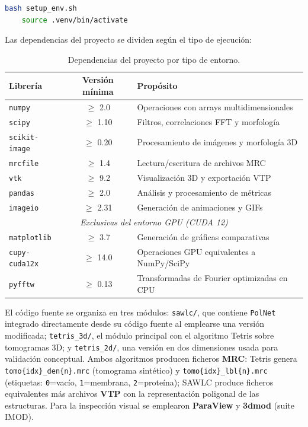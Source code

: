 \begin{enumerate}
    \begin{lstlisting}[language=bash]
    bash setup_env.sh
    source .venv/bin/activate
    \end{lstlisting}

    Las dependencias del proyecto se dividen según el tipo de ejecución:
    
    \begin{table}[H]
        \centering
        \begin{tabular}{|l|c|l|}
        \hline
        \textbf{Librería} & \textbf{Versión mínima} & \textbf{Propósito} \\
        \hline
        \texttt{numpy} & $\geq$ 2.0 & Operaciones con arrays multidimensionales \\
        \texttt{scipy} & $\geq$ 1.10 & Filtros, correlaciones FFT y morfología \\
        \texttt{scikit-image} & $\geq$ 0.20 & Procesamiento de imágenes y morfología 3D \\
        \texttt{mrcfile} & $\geq$ 1.4 & Lectura/escritura de archivos MRC \\
        \texttt{vtk} & $\geq$ 9.2 & Visualización 3D y exportación VTP \\
        \texttt{pandas} & $\geq$ 2.0 & Análisis y procesamiento de métricas \\
        \texttt{imageio} & $\geq$ 2.31 & Generación de animaciones y GIFs \\
        \hline
        \multicolumn{3}{|c|}{\textit{Exclusivas del entorno GPU (CUDA 12)}} \\
        \hline
        \texttt{matplotlib} & $\geq$ 3.7 & Generación de gráficas comparativas \\
        \texttt{cupy-cuda12x} & $\geq$ 14.0 & Operaciones GPU equivalentes a NumPy/SciPy \\
        \texttt{pyfftw} & $\geq$ 0.13 & Transformadas de Fourier optimizadas en CPU \\
        \hline
        \end{tabular}
        \caption{Dependencias del proyecto por tipo de entorno.}
        \label{tab:dependencias}
    \end{table}
     El código fuente se organiza en tres módulos: \texttt{sawlc/}, que contiene \texttt{PolNet} integrado directamente desde su código fuente al emplearse una versión modificada; \texttt{tetris\_3d/}, el módulo principal con el algoritmo Tetris sobre tomogramas 3D; y \texttt{tetris\_2d/}, una versión en dos dimensiones usada para validación conceptual. Ambos algoritmos producen ficheros \textbf{MRC}: Tetris genera \texttt{tomo\{idx\}\_den\{n\}.mrc} (tomograma sintético) y \texttt{tomo\{idx\}\_lbl\{n\}.mrc} (etiquetas: \texttt{0}=vacío, \texttt{1}=membrana, \texttt{2}=proteína); SAWLC produce ficheros equivalentes más archivos \textbf{VTP} con la representación poligonal de las estructuras. Para la inspección visual se emplearon \textbf{ParaView} y \textbf{3dmod} (suite IMOD).

    \end{enumerate}

